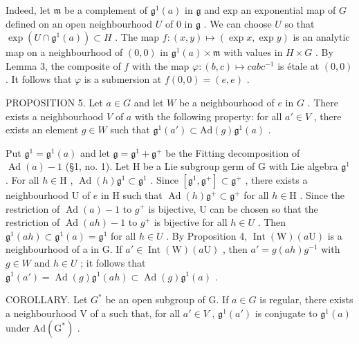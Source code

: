 Indeed, let \(\mathfrak{m}\) be a complement of \(\mathfrak{g}^1(a)\) in \(\mathfrak{g}\) and exp an exponential map of \(G\) defined on an open neighbourhood \(U\) of \(0\) in \(\mathfrak{g}\) . We can choose \(U\) so that \(\exp(U \cap \mathfrak{g}^1(a)) \subset H\) . The map \(f: (x, y) \mapsto (\exp x, \exp y)\) is an analytic map on a neighbourhood of \((0, 0)\) in \(\mathfrak{g}^1(a) \times \mathfrak{m}\) with values in \(H \times G\) . By Lemma 3, the composite of \(f\) with the map \(\varphi: (b, c) \mapsto cabc^{-1}\) is étale at \((0, 0)\) . It follows that \(\varphi\) is a submersion at \(f(0, 0) = (e, e)\) .

PROPOSITION 5. Let \(a \in G\) and let \(W\) be a neighbourhood of \(e\) in \(G\) . There exists a neighbourhood \(V\) of \(a\) with the following property: for all \(a' \in V\) , there exists an element \(g \in W\) such that \(\mathfrak{g}^1(a') \subset \mathrm{Ad}(g)\mathfrak{g}^1(a)\) .

Put \(\mathfrak{g}^1 = \mathfrak{g}^1(a)\) and let \(\mathfrak{g} = \mathfrak{g}^1 + \mathfrak{g}^+\) be the Fitting decomposition of \(\operatorname{Ad}(a) - 1\) (§1, no. 1). Let H be a Lie subgroup germ of G with Lie algebra \(\mathfrak{g}^1\) . For all \(h \in \mathrm{H}\) , \(\operatorname{Ad}(h)\mathfrak{g}^1 \subset \mathfrak{g}^1\) . Since \([\mathfrak{g}^1, \mathfrak{g}^+] \subset \mathfrak{g}^+\) , there exists a neighbourhood U of \(e\) in H such that \(\operatorname{Ad}(h)\mathfrak{g}^+ \subset \mathfrak{g}^+\) for all \(h \in \mathrm{H}\) . Since the restriction of \(\operatorname{Ad}(a)-1\) to \(g^{+}\) is bijective, U can be chosen so that the restriction of \(\operatorname{Ad}(ah)-1\) to \(g^{+}\) is bijective for all \(h\in U\) . Then \(\mathfrak{g}^{1}(ah)\subset\mathfrak{g}^{1}(a)=\mathfrak{g}^{1}\) for all \(h\in U\) . By Proposition 4, \(\operatorname{Int}(\mathrm{W})(a\mathrm{U})\) is a neighbourhood of a in G. If \(a'\in\operatorname{Int}(\mathrm{W})(a\mathrm{U})\) , then \(a'=g(ah)g^{-1}\) with \(g\in W\) and \(h\in U\) ; it follows that \(\mathfrak{g}^{1}(a')=\operatorname{Ad}(g)\mathfrak{g}^{1}(ah)\subset\operatorname{Ad}(g)\mathfrak{g}^{1}(a)\) .

COROLLARY. Let \(G^{*}\) be an open subgroup of G. If \(a \in G\) is regular, there exists a neighbourhood V of a such that, for all \(a' \in V\) , \(\mathfrak{g}^{1}(a')\) is conjugate to \(\mathfrak{g}^{1}(a)\) under \(\mathrm{Ad}(\mathrm{G}^{*})\) .

